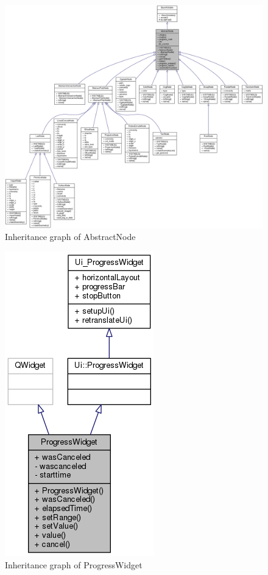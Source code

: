 \begin{figure}[H]
\centering
\includegraphics[width=\linewidth,height=1.37\columnwidth]{images/classAbstractNode__inherit__graph}
\caption{Inheritance graph of AbstractNode}
\label{fig:classabstractnodeinheritgraph}
\end{figure}


\begin{figure}[H]
\centering
\includegraphics[width=0.4\linewidth]{images/classProgressWidget__inherit__graph}
\caption{Inheritance graph of ProgressWidget}
\label{fig:classprogresswidgetinheritgraph}
\end{figure}

